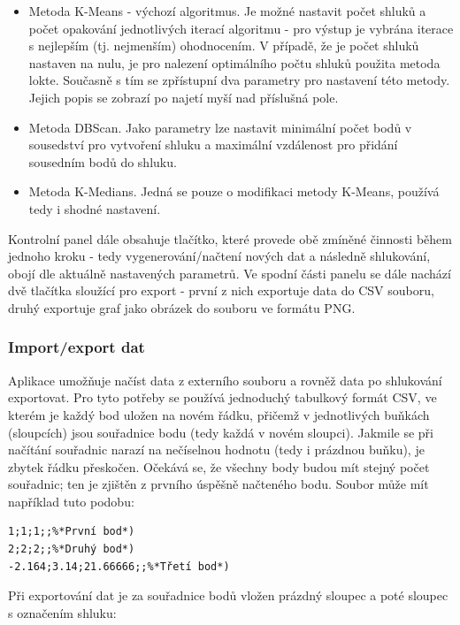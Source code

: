 \documentclass[pdftex,a4paper]{article}
\begin{document}
\begin{itemize}
	\item Metoda K-Means - výchozí algoritmus. Je možné nastavit počet shluků a počet opakování jednotlivých iterací algoritmu - pro výstup je vybrána iterace s nejlepším (tj. nejmenším) ohodnocením. V případě, že je počet shluků nastaven na nulu, je pro nalezení optimálního počtu shluků použita metoda lokte. Současně s tím se zpřístupní dva parametry pro nastavení této metody. Jejich popis se zobrazí po najetí myší nad příslušná pole.
	
	\item Metoda DBScan. Jako parametry lze nastavit minimální počet bodů v sousedství pro vytvoření shluku a maximální vzdálenost pro přidání sousedním bodů do shluku.
	
	\item Metoda K-Medians. Jedná se pouze o modifikaci metody K-Means, používá tedy i shodné nastavení.
\end{itemize}

Kontrolní panel dále obsahuje tlačítko, které provede obě zmíněné činnosti během jednoho kroku - tedy vygenerování/načtení nových dat a následně shlukování, obojí dle aktuálně nastavených parametrů. Ve spodní části panelu se dále nachází dvě tlačítka sloužící pro export - první z nich exportuje data do CSV souboru, druhý exportuje graf jako obrázek do souboru ve formátu PNG.


\subsubsection*{Import/export dat}
Aplikace umožňuje načíst data z externího souboru a rovněž data po shlukování exportovat. Pro tyto potřeby se používá jednoduchý tabulkový formát CSV, ve kterém je každý bod uložen na novém řádku, přičemž v jednotlivých buňkách (sloupcích) jsou souřadnice bodu (tedy každá  v novém sloupci). Jakmile se při načítání souřadnic narazí na nečíselnou hodnotu (tedy i prázdnou buňku), je zbytek řádku přeskočen. Očekává se, že všechny body budou mít stejný počet souřadnic; ten je zjištěn z prvního úspěšně načteného bodu. Soubor může mít například tuto podobu:

\begin{lstlisting}
1;1;1;;%*První bod*)
2;2;2;;%*Druhý bod*)
-2.164;3.14;21.66666;;%*Třetí bod*)
\end{lstlisting}


Při exportování dat je za souřadnice bodů vložen prázdný sloupec a poté sloupec s označením shluku:
\end{document}
